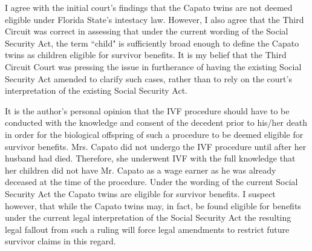\documentclass[letterpaper,10pt]{article}
\begin{document}
I agree with the initial court's findings that the Capato twins are not deemed eligible under Florida State's intestacy law.  However, I also agree that the Third Circuit was correct in assessing that under the current wording of the Social Security Act, the term ``child" is  sufficiently broad enough to define the Capato twins as children eligible for survivor benefits.  It is my belief that the Third Circuit Court was pressing the issue in furtherance of having the existing Social Security Act amended to clarify such cases, rather than to rely on the court's interpretation of the existing Social Security Act.

It is the author's personal opinion that the IVF procedure should have to be conducted with the knowledge and consent of the decedent prior to his/her death in order for the biological offspring of such a procedure to be deemed eligible for survivor benefits.  Mrs. Capato did not undergo the IVF procedure until after her husband had died.  Therefore, she underwent IVF with the full knowledge that her children did not have Mr. Capato as a wage earner as he was already deceased at the time of the procedure.  Under the wording of the current Social Security Act the Capato twins are eligible for survivor benefits.  I suspect however, that while the Capato twins may, in fact, be found eligible for benefits under the current legal interpretation of the Social Security Act the resulting legal fallout from such a ruling will force legal amendments to restrict future survivor claims in this regard.
\end{document}
